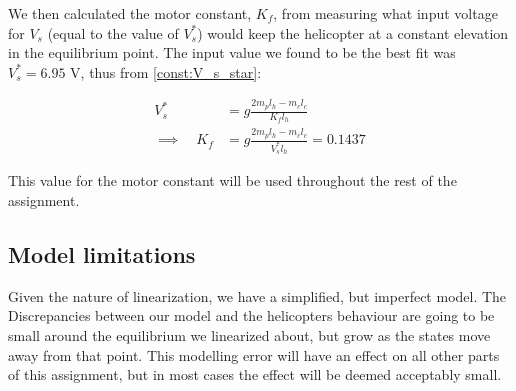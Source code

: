 We then calculated the motor constant, $K_f$, from measuring what input voltage for $V_s$ (equal to the value of $V_s^*$) would keep the helicopter at a constant elevation in the equilibrium point. The input value we found to be the best fit was $V_s^* = 6.95$ V, thus from \cref{const:V_s_star}:

\begin{subequations}
    \begin{align}
        V_{s}^* &= g \frac{2 m_{p} l_{h} - m_{c} l_{c}}{K_{f} l_{h}} \\
        \implies \quad  
        K_f &= g \frac{2 m_{p} l_{h} - m_{c} l_{c}}{V_s^* l_{h}} = 0.1437 \label{const:K_f}
    \end{align}
\end{subequations}

This value for the motor constant will be used throughout the rest of the assignment.


\subsection{Model limitations}
Given the nature of linearization, we have a simplified, but imperfect model. The Discrepancies between our model and the helicopters behaviour are going to be small around the equilibrium we linearized about, but grow as the states move away from that point. This modelling error will have an effect on all other parts of this assignment, but in most cases the effect will be deemed acceptably small.